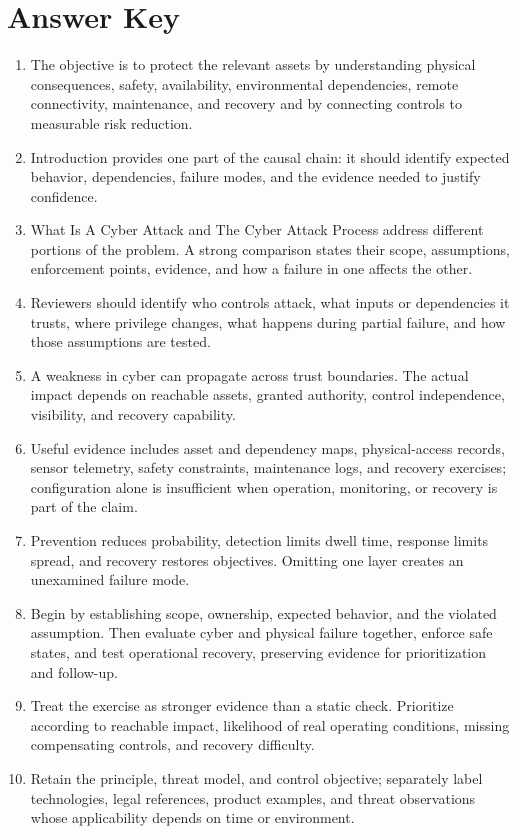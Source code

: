 \documentclass[11pt]{article}
\begin{document}
\section*{Answer Key}
\begin{enumerate}
\item The objective is to protect the relevant assets by understanding physical consequences, safety, availability, environmental dependencies, remote connectivity, maintenance, and recovery and by connecting controls to measurable risk reduction.
\item Introduction provides one part of the causal chain: it should identify expected behavior, dependencies, failure modes, and the evidence needed to justify confidence.
\item What Is A Cyber Attack and The Cyber Attack Process address different portions of the problem. A strong comparison states their scope, assumptions, enforcement points, evidence, and how a failure in one affects the other.
\item Reviewers should identify who controls attack, what inputs or dependencies it trusts, where privilege changes, what happens during partial failure, and how those assumptions are tested.
\item A weakness in cyber can propagate across trust boundaries. The actual impact depends on reachable assets, granted authority, control independence, visibility, and recovery capability.
\item Useful evidence includes asset and dependency maps, physical-access records, sensor telemetry, safety constraints, maintenance logs, and recovery exercises; configuration alone is insufficient when operation, monitoring, or recovery is part of the claim.
\item Prevention reduces probability, detection limits dwell time, response limits spread, and recovery restores objectives. Omitting one layer creates an unexamined failure mode.
\item Begin by establishing scope, ownership, expected behavior, and the violated assumption. Then evaluate cyber and physical failure together, enforce safe states, and test operational recovery, preserving evidence for prioritization and follow-up.
\item Treat the exercise as stronger evidence than a static check. Prioritize according to reachable impact, likelihood of real operating conditions, missing compensating controls, and recovery difficulty.
\item Retain the principle, threat model, and control objective; separately label technologies, legal references, product examples, and threat observations whose applicability depends on time or environment.
\end{enumerate}
\end{document}
